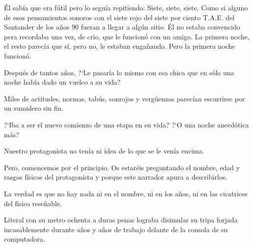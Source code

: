 \'El sab\'ia que era f\'util pero lo segu\'ia repitiendo: Siete, siete, siete. Como si alguno de esos pensamientos sonoros con el siete rojo del siete por ciento T.A.E. del Santander de los a\~nos 90 fueran a llegar a alg\'un sitio. \'El no estaba convencido pera recordaba una vez, de crio, que le funcion\'o con un amigo. La primera noche, el resto parec\'ia que s\'i, pero no, le estaban enga\~nando. Pero la primera noche funcion\'o.

Despu\'es de tantos a\~nos, ?`Le pasar\'ia lo mismo con esa chica que en s\'olo una noche hab\'ia dado un vuelco a su vida?

Miles de actitudes, normas, tab\'us, sonrojos y vergüenzas parec\'ian escurrirse por un sumidero sin fin.

?`Iba a ser el nuevo comienzo de una etapa en su vida? ?`O una noche anecd\'otica m\'as?

Nuestro protagonista no ten\'ia ni idea de lo que se le ven\'ia encima.

Pero, comencemos por el principio. Os estar\'eis preguntando el nombre, edad y rasgos f\'isicos del protagonista y porque este narrador apura a describirlos.

La verdad es que no hay nada ni en el nombre, ni en los a\~nos, ni en las cicatrices del f\'isico rese\~nable.

Literal con su metro ochenta a duras penas lograba disimular su tripa forjada incasablemente durante a\~nos y a\~nos de trabajo delante de la consola de su computadora.